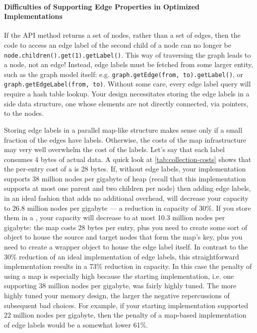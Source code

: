 \paragraph{Difficulties of Supporting Edge Properties in Optimized
Implementations} If the API method  returns a set of
nodes, rather than a set of edges, then the code to access an edge label of the
second child of a node can no longer be
\texttt{node.children().\-get(1).getLabel()}. This way of traversing the graph
leads to a node, not an edge! Instead, edge labels must be fetched from some
larger entity, such as the graph model itself: e.g. \texttt{graph.getEdge(from,
to).getLabel()}, or \texttt{graph.getEdgeLabel(from, to)}. Without some care,
every edge label query will require a hash table lookup. Your design necessitates
storing the edge labels in a side data structure, one whose elements are not
directly connected, via pointers, to the nodes.

Storing edge labels in a parallel map-like structure makes sense only if a small
fraction of the edges have labels. Otherwise, the costs of the map infrastructure
may very well overwhelm the cost of the labels. Let's say that each label
consumes 4 bytes of actual data. A quick look at
\autoref{tab:collection-costs} shows that the per-entry cost of a 
is 28 bytes. If, without edge labels, your implementation supports 38 million
nodes per gigabyte of heap (recall that this implementation supports at most
one parent and two children per node)
then adding edge labels, in an ideal fashion that adds no additional overhead,
will decrease your capacity to 26.8 million nodes per gigabyte --- a reduction
in capacity of 30\%.
If you store them in a , your capacity will decrease to at most
10.3 million nodes per gigabyte: the map costs 28 bytes per entry,
plus you need to create some sort of  object to house the source and
target nodes that form the map's key, plus you need to create a wrapper object to
house the edge label itself.
In contrast to the 30\% reduction of an ideal implementation of edge labels,
this straightforward implementation results in a 73\% reduction in capacity. In
this case the penalty of using a map is especially high because the starting
implementation, i.e. one supporting 38 million nodes per gigabyte, was fairly
highly tuned. The more highly tuned your memory design, the larger the negative
repercussions of subsequent bad choices. For example, if your starting
implementation supported 22 million nodes per gigabyte, then the penalty of a
map-based implementation of edge labels would be a somewhat lower 61\%.

